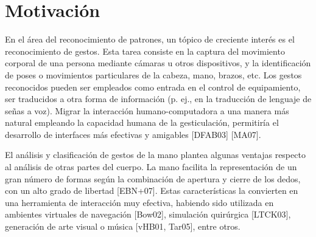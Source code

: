 \section*{Motivación}
En el área del reconocimiento de patrones, un tópico de creciente interés
es el reconocimiento de gestos. Esta tarea consiste en la captura del movimiento
corporal de una persona mediante cámaras u otros dispositivos, y la
identificación de poses o movimientos particulares de la cabeza, mano, brazos, etc.
Los gestos reconocidos pueden ser empleados como entrada en el
control de equipamiento, ser traducidos a otra forma de información (p. ej.,
en la traducción de lenguaje de señas a voz). Migrar la interacción humano-computadora
a una manera más natural empleando la capacidad humana de
la gesticulación, permitiría el desarrollo de interfaces más efectivas y amigables
[DFAB03] [MA07].

El análisis y clasificación de gestos de la mano plantea algunas ventajas
respecto al análisis de otras partes del cuerpo. La mano facilita la representación
de un gran número de formas según la combinación de apertura y cierre
de los dedos, con un alto grado de libertad [EBN+07]. Estas características la
convierten en una herramienta de interacción muy efectiva, habiendo sido utilizada
en ambientes virtuales de navegación [Bow02], simulación quirúrgica
[LTCK03], generación de arte visual o música [vHB01, Tar05], entre otros.

